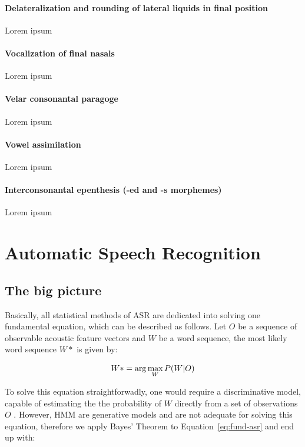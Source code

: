 \paragraph{Delateralization and rounding of lateral liquids in final position}
Lorem ipsum

\paragraph{Vocalization of final nasals}\label{sec:voc-nasals}
Lorem ipsum

\paragraph{Velar consonantal paragoge}
Lorem ipsum

\paragraph{Vowel assimilation}\label{sec:voc-assimilation}
Lorem ipsum

\paragraph{Interconsonantal epenthesis (-ed and -s morphemes)}
Lorem ipsum

\section{Automatic Speech Recognition}\label{sec:speech-recognition}

\subsection{The big picture}

Basically, all statistical methods of \ac{ASR} are dedicated into solving one fundamental 
equation, which can be described as follows. Let $O$ be a sequence of observable acoustic 
feature vectors and $W$ be a word sequence, the most likely word sequence $W*$ is given by:

\begin{equation}{\label{eq:fund-asr}}
W*= \arg\max_{W}P(W|O)
\end{equation}

To solve this equation straightforwadly, one would require a discriminative model,
capable of estimating the the probability of $W$ directly from a set of observations $O$ \cite{Gales2007}.
However, \ac{HMM} are generative models and are not adequate for solving this equation,
therefore we apply Bayes' Theorem to Equation~\ref{eq:fund-asr} and end up with:

